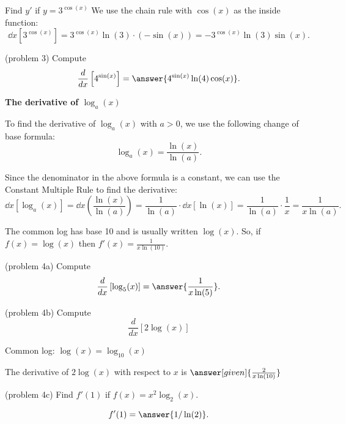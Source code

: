 \documentclass{ximera}
\begin{document}
\begin{example}[example 3]
Find $y'$ if $y = 3^{\cos(x)}$
We use the chain rule with $\cos(x)$ as the inside function:
\[
\dd{x} \left[3^{\cos(x)}\right] = 3^{\cos(x)} \ln(3) \cdot (-\sin(x)) = -3^{\cos(x)} \ln(3) \sin(x).
\]
\end{example}

\begin{problem}(problem 3)
Compute
\[
\dd{x} \left[ 4^{\sin(x)}\right] = \answer{4^{\sin(x)}\ln(4) \cos(x)}.
\]
\end{problem}



\begin{center}
\textbf{The derivative of $\log_a(x)$}
\end{center}

To find the derivative of $\log_a(x)$ with $a > 0$, we use the following change of base formula:
\[
\log_a(x) = \frac{\ln(x)}{\ln(a)}.
\]

Since the denominator in the above formula is a constant, we can use the Constant Multiple Rule to find the derivative:
\[
\dd{x} \left[\log_a(x)\right] = \dd{x} \left(\frac{\ln(x)}{\ln(a)}\right) = \frac{1}{\ln(a)}\cdot \dd{x} \left[\ln(x)\right] = \frac{1}{\ln(a)} \cdot \frac{1}{x} = \frac{1}{x\ln(a)}.
\]


\begin{example}[example 4]
The common log has base 10 and is usually written $\log(x)$.
So, if $f(x) = \log(x)$ then $f'(x) = \frac{1}{x\ln(10)}.$
\end{example}



\begin{problem}(problem 4a)
Compute
\[
\ddx \left[\log_5(x)\right] = \answer{\frac{1}{x\ln(5)}}.
\]
\end{problem}


\begin{problem}(problem 4b)
  Compute 
  \[
  \frac{d}{dx} \left[2\log(x)\right]
  \]
  
		\begin{hint}
		  Common log: $\log(x) = \log_{10}(x)$ 
		\end{hint}
	
		
		The derivative of $2\log(x)$ with respect to $x$ is
		 $\answer[given]{\frac{2}{x\ln(10)}}$
	
\end{problem}


\begin{problem}(problem 4c)
Find $f'(1)$ if $f(x) = x^2 \log_2(x)$.

\[
f'(1) = \answer{1/\ln(2)}.
\]

\end{problem}
\end{document}

